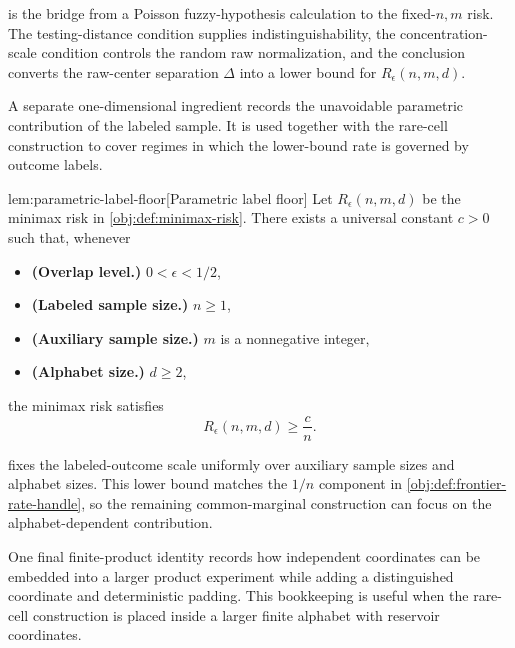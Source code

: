  is the bridge from a Poisson fuzzy-hypothesis calculation to the fixed-\(n,m\) risk. The testing-distance condition supplies indistinguishability, the concentration-scale condition controls the random raw normalization, and the conclusion converts the raw-center separation \(\Delta\) into a lower bound for \(R_\epsilon(n,m,d)\).

A separate one-dimensional ingredient records the unavoidable parametric contribution of the labeled sample. It is used together with the rare-cell construction to cover regimes in which the lower-bound rate is governed by outcome labels.

\begin{lemmav}{lem:parametric-label-floor}[Parametric label floor]
Let \(R_\epsilon(n,m,d)\) be the minimax risk in \cref{obj:def:minimax-risk}. There exists a universal constant \(c>0\) such that, whenever
\begin{itemize}
\item \textbf{(Overlap level.)} \(0<\epsilon<1/2\),
\item \textbf{(Labeled sample size.)} \(n\ge 1\),
\item \textbf{(Auxiliary sample size.)} \(m\) is a nonnegative integer,
\item \textbf{(Alphabet size.)} \(d\ge 2\),
\end{itemize}
the minimax risk satisfies
\[
R_\epsilon(n,m,d)\ge \frac{c}{n}.
\]
\end{lemmav}

 fixes the labeled-outcome scale uniformly over auxiliary sample sizes and alphabet sizes. This lower bound matches the \(1/n\) component in \cref{obj:def:frontier-rate-handle}, so the remaining common-marginal construction can focus on the alphabet-dependent contribution.

One final finite-product identity records how independent coordinates can be embedded into a larger product experiment while adding a distinguished coordinate and deterministic padding. This bookkeeping is useful when the rare-cell construction is placed inside a larger finite alphabet with reservoir coordinates.


